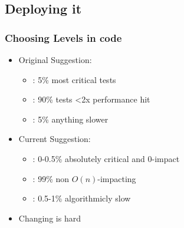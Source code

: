 \subsection{Deploying it}
\begin{frame}
  \tableofcontents[currentsection,currentsubsection,subsectionstyle=show/shaded/hide]
\end{frame}

\begin{frame}
  \frametitle{Choosing Levels in code}
  \begin{itemize}
  \item Original Suggestion:\pause
    \begin{itemize}
    \item {}: 5\% most critical tests \pause
    \item {}: 90\% tests <2x performance hit \pause
    \item {}: 5\% anything slower \pause
    \end{itemize}
  \item Current Suggestion:\pause
    \begin{itemize}
    \item {}: 0-0.5\% absolutely critical and 0-impact \pause
    \item {}: 99\% non $O(n)$-impacting \pause
    \item {}: 0.5-1\% algorithmicly slow \pause
    \end{itemize}
  \item Changing is hard
  \end{itemize}

\end{frame}
  
